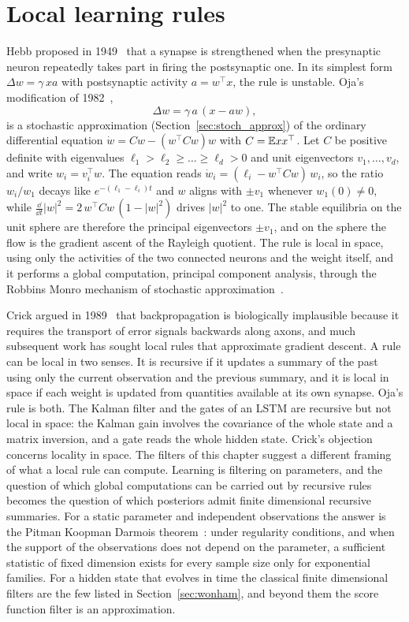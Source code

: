 \section{Local learning rules}

Hebb proposed in 1949~\cite{hebb1949} that a synapse is strengthened when the presynaptic neuron repeatedly takes part in firing the postsynaptic one. In its simplest form $\Delta w = \gamma\,xa$ with postsynaptic activity $a = w^\top x$, the rule is unstable. Oja's modification of 1982~\cite{oja1982},
\[
\Delta w = \gamma\,a\,(x-aw),
\]
is a stochastic approximation (Section~\ref{sec:stoch_approx}) of the ordinary differential equation $\dot w = Cw-(w^\top Cw)w$ with $C = \mathbb{E} xx^\top$. Let $C$ be positive definite with eigenvalues $\ell_1>\ell_2\geq\dots\geq\ell_d>0$ and unit eigenvectors $v_1,\dots,v_d$, and write $w_i = v_i^\top w$. The equation reads $\dot w_i = (\ell_i-w^\top Cw)\,w_i$, so the ratio $w_i/w_1$ decays like $e^{-(\ell_1-\ell_i)t}$ and $w$ aligns with $\pm v_1$ whenever $w_1(0)\neq0$, while $\frac{\dd}{\dd t}|w|^2 = 2\,w^\top Cw\,(1-|w|^2)$ drives $|w|^2$ to one. The stable equilibria on the unit sphere are therefore the principal eigenvectors $\pm v_1$, and on the sphere the flow is the gradient ascent of the Rayleigh quotient. The rule is local in space, using only the activities of the two connected neurons and the weight itself, and it performs a global computation, principal component analysis, through the Robbins Monro mechanism of stochastic approximation~\cite{robbinsmonro1951}.

Crick argued in 1989~\cite{crick1989} that backpropagation is biologically implausible because it requires the transport of error signals backwards along axons, and much subsequent work has sought local rules that approximate gradient descent. A rule can be local in two senses. It is recursive if it updates a summary of the past using only the current observation and the previous summary, and it is local in space if each weight is updated from quantities available at its own synapse. Oja's rule is both. The Kalman filter and the gates of an LSTM are recursive but not local in space: the Kalman gain involves the covariance of the whole state and a matrix inversion, and a gate reads the whole hidden state. Crick's objection concerns locality in space. The filters of this chapter suggest a different framing of what a local rule can compute. Learning is filtering on parameters, and the question of which global computations can be carried out by recursive rules becomes the question of which posteriors admit finite dimensional recursive summaries. For a static parameter and independent observations the answer is the Pitman Koopman Darmois theorem~\cite{pitman1936,koopman1936,darmois1935}: under regularity conditions, and when the support of the observations does not depend on the parameter, a sufficient statistic of fixed dimension exists for every sample size only for exponential families. For a hidden state that evolves in time the classical finite dimensional filters are the few listed in Section~\ref{sec:wonham}, and beyond them the score function filter is an approximation.

